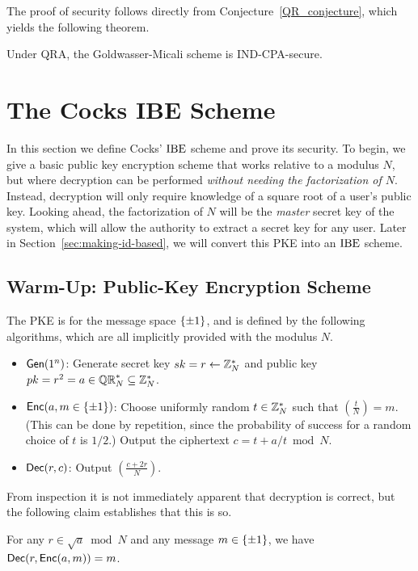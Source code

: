 \documentclass[11pt]{article}
\begin{document}
The proof of security follows directly from
Conjecture~\ref{QR_conjecture}, which yields the following theorem.

\begin{theorem}
  Under QRA, the Goldwasser-Micali scheme is IND-CPA-secure.
\end{theorem}

\section{The Cocks IBE Scheme}
\label{sec:cocks-scheme}

In this section we define Cocks' $\text{IBE}$ scheme and prove its security.
To begin, we give a basic public key encryption scheme that works
relative to a modulus $N$, but where decryption can be performed
\emph{without needing the factorization of $N$}.  Instead, decryption
will only require knowledge of a square root of a user's public key.
Looking ahead, the factorization of $N$ will be the \emph{master}
secret key of the system, which will allow the authority to extract a
secret key for any user.  Later in Section~\ref{sec:making-id-based},
we will convert this PKE into an $\text{IBE}$ scheme.

\subsection{Warm-Up: Public-Key Encryption Scheme}
\label{sec:warm-up:-public}

The PKE is for the message space $\{\pm 1\}$, and is defined by the
following algorithms, which are all implicitly provided with the
modulus $N$.
\begin{itemize}
\item $\mathsf{Gen}(1^n)$: Generate secret key $sk = r \gets \mathbb{Z}_N^{*}$ and
  public key $pk = r^2 = a \in \mathbb{QR}_{N}^{*} \subseteq \mathbb{Z}_N^{*}$.
\item $\mathsf{Enc}(a, m \in \{\pm 1\})$: Choose uniformly random $t \in
  \mathbb{Z}_N^*$ such that $\left( \frac{t}{N}\right) = m$.  (This can be
  done by repetition, since the probability of success for a random
  choice of $t$ is $1/2$.)  Output the ciphertext $c = t + a/t \bmod
  N$.
\item $\mathsf{Dec}(r,c)$: Output $\left( \frac{c+2r}{N} \right)$.
\end{itemize}

From inspection it is not immediately apparent that decryption is
correct, but the following claim establishes that this is so.

\begin{claim}
  \label{dec_correct}
  For any $r \in \sqrt{a} \bmod N$ and any message $m \in \{\pm
    1\}$, we have $\mathsf{Dec}(r, \mathsf{Enc}(a, m)) = m$.
\end{claim}
\end{document}
